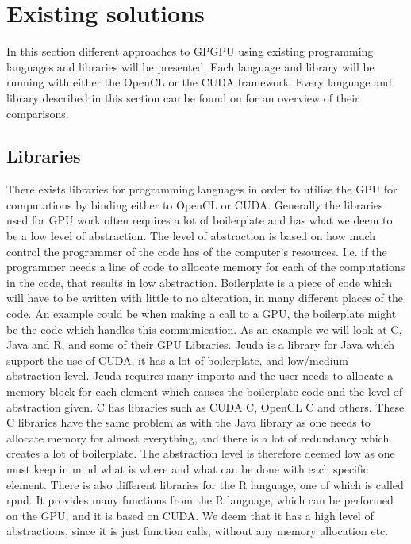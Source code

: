 \section{Existing solutions} %
\label{sec:state_of_the_art}
In this section different approaches to GPGPU using existing programming languages and libraries will be presented.
Each language and library will be running with either the OpenCL or the CUDA framework.
Every language and library described in this section can be found on  for an overview of their comparisons.
      
\subsection{Libraries} 
There exists libraries for programming languages in order to utilise the GPU for computations by binding either to OpenCL or CUDA.
Generally the libraries used for GPU work often requires a lot of boilerplate and has what we deem to be a low level of abstraction.
The level of abstraction is based on how much control the programmer of the code has of the computer's resources.
I.e. if the programmer needs a line of code to allocate memory for each of the computations in the code, that results in low abstraction.
Boilerplate is a piece of code which will have to be written with little to no alteration, in many different places of the code.
An example could be when making a call to a GPU, the boilerplate might be the code which handles this communication.
As an example we will look at C, Java and R, and some of their GPU Libraries.
Jcuda is a library for Java which support the use of CUDA, it has a lot of boilerplate, and low/medium abstraction level\citep{Java_library}. 
Jcuda requires many imports and the user needs to allocate a memory block for each element which causes the boilerplate code and the level of abstraction given.\citep{Java_malloc}
C has libraries such as CUDA C, OpenCL C and others.
These C libraries have the same problem as with the Java library as one needs to allocate memory for almost everything, and there is a lot of redundancy which creates a lot of boilerplate.
The abstraction level is therefore deemed low as one must keep in mind what is where and what can be done with each specific element.\citep{C_CUDA} 
There is also different libraries for the R language, one of which is called rpud.
It provides many functions from the R language, which can be performed on the GPU, and it is based on CUDA.
We deem that it has a high level of abstractions, since it is just function calls, without any memory allocation etc. \citep{Rcuda}                                                 


